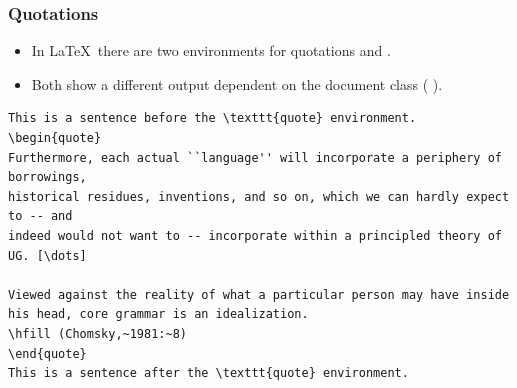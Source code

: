 \begin{frame}[fragile]
\frametitle{Quotations}
\begin{itemize}
	

\item In \LaTeX\, there are two environments for quotations  and .

\item Both show a different output dependent on the document class (\fe {} \vs {}).


%	
%
\end{itemize}
%
%


\begin{lstlisting}
This is a sentence before the \texttt{quote} environment.
\begin{quote}
Furthermore, each actual ``language'' will incorporate a periphery of borrowings,
historical residues, inventions, and so on, which we can hardly expect to -- and
indeed would not want to -- incorporate within a principled theory of UG. [\dots]

Viewed against the reality of what a particular person may have inside
his head, core grammar is an idealization.
\hfill (Chomsky,~1981:~8)
\end{quote}
This is a sentence after the \texttt{quote} environment.
\end{lstlisting}

%
%


\end{frame}
